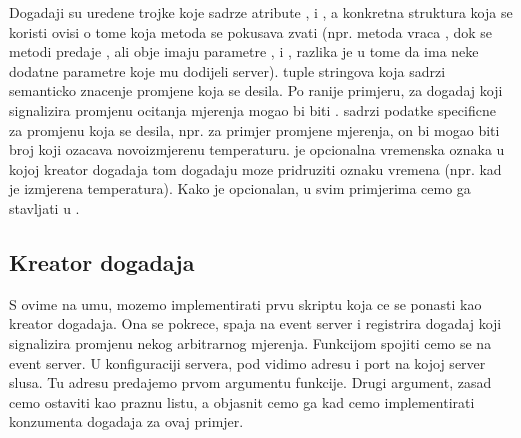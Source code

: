 \documentclass[letterpaper,10pt,croatian]{sphinxmanual}
\begin{document}
\sphinxAtStartPar
Dogadaji su uredene trojke koje sadrze atribute ,  i
, a konkretna struktura koja se koristi ovisi o tome koja
metoda se pokusava zvati (npr. metoda  vraca ,
dok se metodi  predaje ,
ali obje imaju parametre ,  i ,
razlika je u tome da  ima neke dodatne parametre koje
mu dodijeli server).  tuple stringova koja sadrzi semanticko
znacenje promjene koja se desila. Po ranije primjeru,  za dogadaj
koji signalizira promjenu ocitanja mjerenja mogao bi biti .   sadrzi podatke specificne za promjenu
koja se desila, npr. za primjer promjene mjerenja, on bi mogao biti broj koji
ozacava novoizmjerenu temperaturu.  je opcionalna vremenska
oznaka u kojoj kreator dogadaja tom dogadaju moze pridruziti oznaku vremena
(npr. kad je izmjerena temperatura). Kako je  opcionalan, u
svim primjerima cemo ga stavljati u .


\subsection{Kreator dogadaja}
\label{\detokenize{hat/event_bus:kreator-dogadaja}}
\sphinxAtStartPar
S ovime na umu, mozemo implementirati prvu skriptu koja ce se ponasti kao
kreator dogadaja. Ona se pokrece, spaja na event server i registrira dogadaj
koji signalizira promjenu nekog arbitrarnog mjerenja. Funkcijom 
spojiti cemo se na event server. U konfiguraciji servera, pod
 vidimo adresu i port na kojoj server slusa. Tu adresu
predajemo prvom argumentu  funkcije. Drugi argument,
 zasad cemo ostaviti kao praznu listu, a objasnit cemo ga kad
cemo implementirati konzumenta dogadaja za ovaj primjer.
\end{document}
